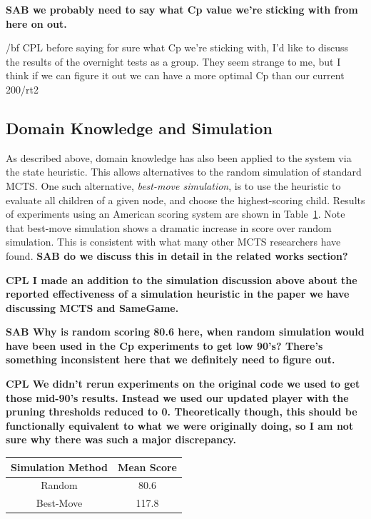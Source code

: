 \documentclass[letterpaper]{article}
\begin{document}
{\bf SAB we probably need to say what Cp value we're sticking with from here on out.}

{/bf CPL before saying for sure what Cp we're sticking with, I'd like to discuss the results of the overnight tests as a group. They seem strange to me, but I think if we can figure it out we can have a more optimal Cp than our current 200/rt2}

\subsection{Domain Knowledge and Simulation}


As described above, domain knowledge has also been applied to the system via the state heuristic. This allows alternatives to the random simulation of standard MCTS. One such alternative, {\it best-move simulation}, is to use the heuristic to evaluate all children of a given node, and choose the highest-scoring child. Results of experiments using an American scoring system are shown in Table~\ref{tbl:Simulate}. Note that best-move simulation shows a dramatic increase in score over random simulation. This is consistent with what many other MCTS researchers have found. {\bf SAB do we discuss this in detail in the related works section?}

{\bf CPL I made an addition to the simulation discussion above about the reported effectiveness of a simulation heuristic in the paper we have discussing MCTS and SameGame.}

{\bf SAB Why is random scoring 80.6 here, when random simulation would have been used in the Cp experiments to get low 90's? There's something inconsistent here that we definitely need to figure out.}

{\bf CPL We didn't rerun experiments on the original code we used to get those mid-90's results. Instead we used our updated player with the pruning thresholds reduced to 0. Theoretically though, this should be functionally equivalent to what we were originally doing, so I am not sure why there was such a major discrepancy.}

\begin{table}
\label{tbl:Simulate}
\centering
\begin{tabular}{c c}
\hline
Simulation Method & Mean Score \\
\hline
Random & 80.6 \\
Best-Move & 117.8 \\
\hline
\end{tabular}
\end{table}
\end{document}
